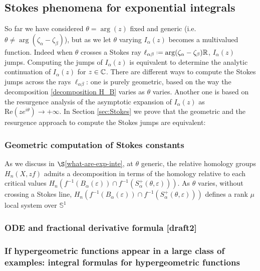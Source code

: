 \documentclass[11pt,a4paper,twoside,leqno,noamsfonts]{amsart}
\numberwithin{equation}{section}
\begin{document}
\subsection{Stokes phenomena for exponential integrals}
So far we have considered $\theta=\arg(z)$ fixed and generic (i.e. $\theta\neq\arg(\zeta_\alpha-\zeta_\beta)$), but as we let $\theta$ varying $I_{\alpha}(z)$ becomes a multivalued function. Indeed when $\theta$ crosses a Stokes ray $\ell_{\alpha\beta}\defeq\arg(\zeta_\alpha-\zeta_\beta)\R$, $I_\alpha(z)$ jumps. Computing the jumps of $I_{\alpha}(z)$ is equivalent to determine the analytic continuation of $I_\alpha(z)$ for $z\in\mathbb C$. There are different ways to compute the Stokes jumps across the rays $\ell_{\alpha\beta}$: one is purely geometric, based on the way the decomposition \eqref{decomposition H_B} varies as $\theta$ varies. Another one is based on the resurgence analysis of the asymptotic expansion of $I_{\alpha}(z)$ as $\mathrm{Re}(z e^{i\theta})\to +\infty$. In Section \ref{sec:Stokes} we prove that the geometric and the resurgence approach to compute the Stokes jumps are equivalent:
\begin{theorem}

\end{theorem}  

    
\subsubsection{Geometric computation of Stokes constants}
As we discuss in $\S$\ref{what-are-exp-inte}, at $\theta$ generic, the relative homology groups $H_n(X,zf)$ admits a decomposition in terms of the homology relative to each critical values $H_n(f^{-1}(B_\alpha(\varepsilon))\cap f^{-1}(S_\alpha^+(\theta,\varepsilon)))$. As $\theta$ varies, without crossing a Stokes line, $H_n(f^{-1}(B_\alpha(\varepsilon))\cap f^{-1}(S_\alpha^+(\theta,\varepsilon)))$ defines a rank $\mu$ local system over $\mathbb{S}^1$  


\subsubsection{ ODE and fractional derivative formula [draft2]}

\subsubsection{If hypergeometric functions appear in a large class of examples: integral formulas for hypergeometric functions }
\end{document}
